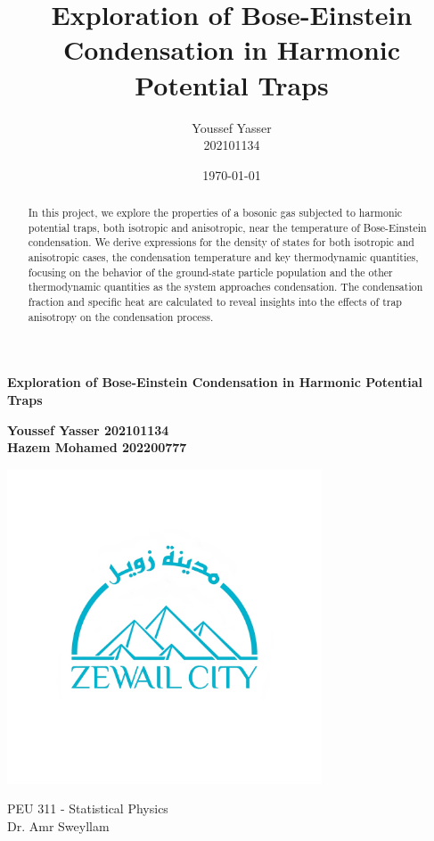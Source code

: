 \documentclass{article}
\title{Exploration of Bose-Einstein Condensation in Harmonic Potential Traps}
\author{Youssef Yasser \\ 202101134}
\date{\today}
\numberwithin{equation}{section}
\numberwithin{equation}{subsection}
\begin{document}
\begin{titlepage}
    \centering
    \vspace*{2cm}
    
    \Huge
    \textbf{Exploration of Bose-Einstein Condensation in Harmonic Potential Traps}
    
    \vspace{0.5cm}
    \LARGE
    
    
    \vspace{1.5cm}
    
    \textbf{Youssef Yasser 202101134}\\
    \textbf{Hazem Mohamed 202200777}
    
    
    
    
    \vspace{1.5cm}
    \includegraphics[width=0.7\textwidth]{zewailcity logo.jpg}

    \Large
    PEU 311 - Statistical Physics\\
    Dr. Amr Sweyllam
\end{titlepage}

\newpage
\tableofcontents
\newpage
\begin{abstract}
    In this project, we explore the properties of a bosonic gas subjected to harmonic potential traps, both isotropic and anisotropic, near the temperature of Bose-Einstein condensation.
     We derive expressions for the density of states for both isotropic and anisotropic cases, the condensation temperature and key thermodynamic quantities, focusing on the behavior of the ground-state particle population and the other thermodynamic quantities as the system approaches condensation.
     The condensation fraction and specific heat are calculated to reveal insights into the effects of trap anisotropy on the condensation process. 
\end{abstract}
\end{document}
